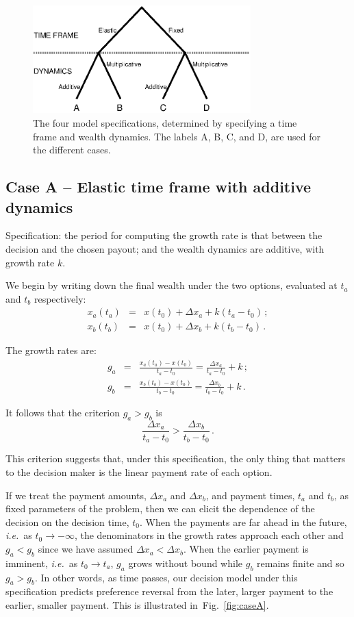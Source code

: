 \documentclass[11pt]{article}
\newcommand{\ie}{{\it i.e.}\ }
\newcommand{\flabel}[1]{\label{fig:#1}}
\newcommand{\fref}[1]{Fig.~\ref{fig:#1}}
\newcommand{\be}{\begin{equation}}
\newcommand{\ee}{\end{equation}}
\newcommand{\bea}{\begin{eqnarray}}
\newcommand{\eea}{\end{eqnarray}}
\newcommand{\Dx}{\Delta x}
\numberwithin{equation}{section}
\begin{document}
\begin{figure}[!htb]
\centering
\includegraphics[width=0.75\textwidth]{./figures/tree.eps}
\caption{The four model specifications, determined by specifying a time frame and wealth dynamics. The labels A, B, C, and D, are used for the different cases.}
\flabel{tree}
\end{figure}

\subsection{Case A -- Elastic time frame with additive dynamics}\label{sec:case_A}

Specification: the period for computing the growth rate is that between the decision and the chosen payout; and the wealth dynamics are additive, with growth rate $k$.

We begin by writing down the final wealth under the two options, evaluated at $t_a$ and $t_b$ respectively:
\bea
x_a\left(t_a\right) &=& x\left(t_0\right) + \Dx_a + k(t_a-t_0)\,;\\
x_b\left(t_b\right) &=& x\left(t_0\right) + \Dx_b + k(t_b-t_0)\,.
\eea

The growth rates are:
\bea
g_a &=& \frac{x_a\left(t_a\right) - x\left(t_0\right)}{t_a-t_0} = \frac{\Dx_a}{t_a-t_0} + k\,;\\
g_b &=& \frac{x_b\left(t_b\right) - x\left(t_0\right)}{t_b-t_0} = \frac{\Dx_b}{t_b-t_0} + k\,.
\eea

It follows that the criterion $g_a > g_b$ is
\be
\frac{\Dx_a}{t_a-t_0} > \frac{\Dx_b}{t_b-t_0}\,.
\ee

This criterion suggests that, under this specification, the only thing that matters to the decision maker is the linear payment rate of each option.

If we treat the payment amounts, $\Dx_a$ and $\Dx_b$, and payment times, $t_a$ and $t_b$, as fixed parameters of the problem, then we can elicit the dependence of the decision on the decision time, $t_0$. When the payments are far ahead in the future, \ie as $t_0\to-\infty$, the denominators in the growth rates approach each other and $g_a<g_b$ since we have assumed $\Dx_a<\Dx_b$. When the earlier payment is imminent, \ie as $t_0\to t_a$, $g_a$ grows without bound while $g_b$ remains finite and so $g_a>g_b$. In other words, as time passes, our decision model under this specification predicts preference reversal from the later, larger payment to the earlier, smaller payment. This is illustrated in~\fref{caseA}.
\end{document}
